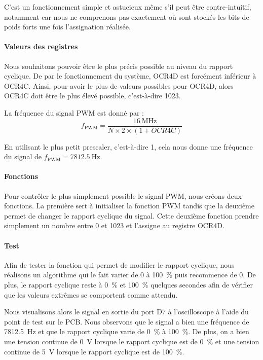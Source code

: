 \documentclass[12pt, a4paper, titlepage]{article}
\begin{document}
C'est un fonctionnement simple et astucieux même s'il peut être contre-intuitif, notamment car nous ne comprenons pas exactement où sont stockés les bits de poids forts une fois l'assignation réalisée.

\paragraph{Valeurs des registres}

Nous souhaitons pouvoir être le plus précis possible au niveau du rapport cyclique. De par le fonctionnement du système, OCR4D est forcément inférieur à OCR4C. Ainsi, pour avoir le plus de valeurs possibles pour OCR4D, alors OCR4C doit être le plus élevé possible, c'est-à-dire 1023.

La fréquence du signal PWM est donné par : \nopagebreak
\[f_{\text{PWM}} = \frac{\SI{16}{\mega\hertz}}{N \times 2 \times (1 + OCR4C)}\]

En utilisant le plus petit prescaler, c'est-à-dire 1, cela nous donne une fréquence du signal de $\boxed{f_{\text{PWM}} = \SI{7812.5}{\hertz}}$.

\paragraph{Fonctions}

Pour contrôler le plus simplement possible le signal PWM, nous créons deux fonctions. La première sert à initialiser la fonction PWM tandis que la deuxième permet de changer le rapport cyclique du signal. Cette deuxième fonction prendre simplement un nombre entre 0 et 1023 et l'assigne au registre OCR4D.

\paragraph{Test}

Afin de tester la fonction qui permet de modifier le rapport cyclique, nous réalisons un algorithme qui le fait varier de 0 à \SI{100}{\percent} puis recommence de 0. De plus, le rapport cyclique reste à \SI{0}{\percent} et \SI{100}{\percent} quelques secondes afin de vérifier que les valeurs extrêmes se comportent comme attendu.

Nous visualisons alors le signal en sortie du port D7 à l'oscilloscope à l'aide du point de test sur le PCB. Nous observons que le signal a bien une fréquence de \SI{7812.5}{\hertz} et que le rapport cyclique varie de \SI{0}{\percent} à \SI{100}{\percent}. De plus, on a bien une tension continue de \SI{0}{\volt} lorsque le rapport cyclique est de \SI{0}{\percent} et une tension continue de \SI{5}{\volt} lorsque le rapport cyclique est de \SI{100}{\percent}.
\end{document}
